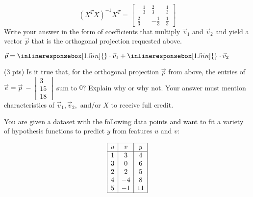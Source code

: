 \documentclass[twoside,12pt]{article}
\begin{document}
\begin{probset}
\begin{prob}
\begin{subprobset}
\begin{subprob}
        $$(X^T X) ^{-1}X^T = \begin{bmatrix}
            -\frac{1}{3} & \frac{2}{3} & \frac{1}{3} \\[6pt]
            \frac{2}{3} & -\frac{1}{3} & \frac{1}{3}  
        \end{bmatrix}$$ 
        Write your answer in the form of coefficients that multiply $\vec{v}_1$ and $\vec{v}_2$ and yield a vector $\vec{p}$ that is the orthogonal projection requested above.
        \begin{center}
            $\vec{p} = \inlineresponsebox[1.5in]{}\cdot \vec{v}_1 + \inlineresponsebox[1.5in]{}\cdot \vec{v}_2$
        \end{center}
    \end{subprob}
\bigskip
    \begin{subprob}(3 pts)
        Is it true that, for the orthogonal projection $\vec{p}$ from above, the entries of \\ $\vec{e} = \vec{p} \ - \begin{bmatrix} 3 \\ 15 \\ 18 \end{bmatrix}$ sum to $0$? Explain why or why not. Your answer must mention characteristics of $\vec{v}_1,\vec{v}_2,$ and/or $X$ to receive full credit.

        \begin{center}
        \end{center}

        \begin{responsebox}{1.2in}
            
        \end{responsebox}
    \end{subprob}

\end{subprobset}

\end{prob}

\newpage \begin{prob}

You are given a dataset with the following data points and want to fit a variety of hypothesis functions to predict $y$ from features $u$ and $v$:

\[
\begin{array}{|c|c|c|}
\hline
u & v & y \\
\hline
1 & 3  & 4  \\
3 & 0  & 6  \\
2 & 2  & 5  \\
4 & -4 & 8  \\
5 & -1 & 11 \\
\hline
\end{array}
\]


\end{prob}
\end{probset}
\end{document}
